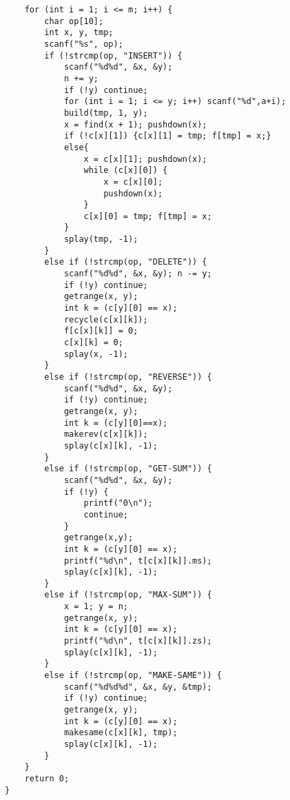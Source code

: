 \begin{lstlisting}
	for (int i = 1; i <= m; i++) {
		char op[10];
		int x, y, tmp;
		scanf("%s", op);
		if (!strcmp(op, "INSERT")) {
			scanf("%d%d", &x, &y);
			n += y;
			if (!y) continue;
			for (int i = 1; i <= y; i++) scanf("%d",a+i);
			build(tmp, 1, y);
			x = find(x + 1); pushdown(x);
			if (!c[x][1]) {c[x][1] = tmp; f[tmp] = x;}
			else{
				x = c[x][1]; pushdown(x);
				while (c[x][0]) {
					x = c[x][0];
					pushdown(x);
				}
				c[x][0] = tmp; f[tmp] = x;
			}
			splay(tmp, -1);
		}
		else if (!strcmp(op, "DELETE")) {
			scanf("%d%d", &x, &y); n -= y;
			if (!y) continue;
			getrange(x, y);
			int k = (c[y][0] == x);
			recycle(c[x][k]);
			f[c[x][k]] = 0;
			c[x][k] = 0;
			splay(x, -1);
		}
		else if (!strcmp(op, "REVERSE")) {
			scanf("%d%d", &x, &y);
			if (!y) continue;
			getrange(x, y);
			int k = (c[y][0]==x);
			makerev(c[x][k]);
			splay(c[x][k], -1);
		}
		else if (!strcmp(op, "GET-SUM")) {
			scanf("%d%d", &x, &y);
			if (!y) {
				printf("0\n");
				continue;
			}
			getrange(x,y);
			int k = (c[y][0] == x);
			printf("%d\n", t[c[x][k]].ms);
			splay(c[x][k], -1);
		}
		else if (!strcmp(op, "MAX-SUM")) {
			x = 1; y = n;
			getrange(x, y);
			int k = (c[y][0] == x);
			printf("%d\n", t[c[x][k]].zs);
			splay(c[x][k], -1);
		}
		else if (!strcmp(op, "MAKE-SAME")) {
			scanf("%d%d%d", &x, &y, &tmp);
			if (!y) continue;
			getrange(x, y);
			int k = (c[y][0] == x);
			makesame(c[x][k], tmp);
			splay(c[x][k], -1);
		}
	}
	return 0;
}
\end{lstlisting}
